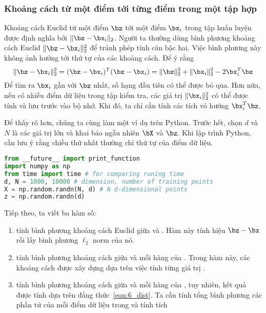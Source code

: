 \subsubsection{Khoảng cách từ một điểm tới từng điểm trong một tập hợp}
Khoảng cách Euclid từ một điểm $\bz$ tới một điểm $\bx_i$ trong tập
huấn luyện được định nghĩa bởi $\|\bz - \bx_i\|_2$. Người ta thường dùng bình phương khoảng cách Euclid $\|\bz -\bx_i\|_2^2$ để tránh phép tính căn bậc hai. Việc bình phương này không ảnh hưởng tới thứ tự của các khoảng cách. Để ý rằng
\begin{equation}
\label{eqn:6_dist}
    \|\bz - \bx_i\|_2^2 = (\bz - \bx_i)^T(\bz - \bx_i) = \|\bz\|_2^2 +
        \|\bx_i\|_2^2 - 2\bx_i^T\bz 
\end{equation}
Để tìm ra $\bx_i$ gần với $\bz$ nhất, số hạng đầu tiên
có thể được bỏ qua. Hơn nữa, nếu có nhiều điểm dữ liệu trong tập kiểm tra, các
giá trị $\|\bx_i\|_2^2$ có thể được tính và lưu trước vào bộ nhớ. Khi đó, ta chỉ
cần tính các tích vô hướng $\bx_i^T\bz$.

Để thấy rõ hơn, chúng ta cùng làm một ví dụ trên Python. Trước hết, chọn $d$ và
$N$ là các giá trị lớn và khai báo ngẫu nhiên $\bX$ và $\bz$. Khi lập trình Python, cần lưu ý rằng chiều thứ nhất thường chỉ thứ tự của điểm dữ liệu.
\begin{lstlisting}[language=Python]
from __future__ import print_function 
import numpy as np 
from time import time # for comparing runing time 
d, N = 1000, 10000 # dimension, number of training points 
X = np.random.randn(N, d) # N d-dimensional points 
z = np.random.randn(d) 
\end{lstlisting}

Tiếp theo, ta viết ba hàm số: 
\begin{enumerate}

    \item {} tính bình phương khoảng cách Euclid giữa  và . Hàm này tính hiệu $\bz - \bx$ rồi lấy bình phương $\ell_2$ norm của nó. 


    \item {} tính bình phương khoảng cách giữa
     và mỗi {hàng} của . Trong hàm này,
    các khoảng cách được xây dựng dựa trên việc tính từng giá trị
    . 

    \item {} tính bình phương khoảng cách giữa
     và mỗi {hàng} của , tuy nhiên, kết
    quả được tính dựa trên đẳng thức~\eqref{eqn:6_dist}. Ta cần tính tổng bình phương các phần tử của mỗi điểm dữ liệu trong  và tính tích 
\end{enumerate}

